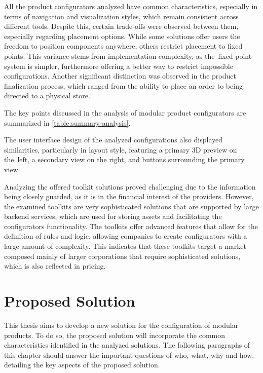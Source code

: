 All the product configurators analyzed have common characteristics, especially in terms of navigation and visualization styles, which remain consistent across different tools. Despite this, certain trade-offs were observed between them, especially regarding placement options. While some solutions offer users the freedom to position components anywhere, others restrict placement to fixed points. This variance stems from implementation complexity, as the~fixed-point system is simpler, furthermore offering a better way to restrict impossible configurations.
Another significant distinction was observed in the product finalization process, which ranged from the ability to place an order to being directed to a physical store.

The key points discussed in the analysis of modular product configurators are summarized in \autoref{table:summary-analysis}.

The user interface design of the analyzed configurations also displayed similarities, particularly in layout style, featuring a primary 3D preview on the~left, a secondary view on the right, and buttons surrounding the primary view.

Analyzing the offered toolkit solutions proved challenging due to the information being closely guarded, as it is in the financial interest of the providers. However, the examined toolkits are very sophisticated solutions that are supported by large backend services, which are used for storing assets and facilitating the configurators functionality. The toolkits offer advanced features that allow for the definition of rules and logic, allowing companies to create configurators with a large amount of complexity. This indicates that these toolkits target a market composed mainly of larger corporations that require sophisticated solutions, which is also reflected in pricing.

\section{Proposed Solution}

This thesis aims to develop a new solution for the configuration of modular products. To do so, the proposed solution will incorporate the common characteristics identified in the analyzed solutions. The following paragraphs of this chapter should answer the important questions of who, what, why and how, detailing the key aspects of the proposed solution. 

